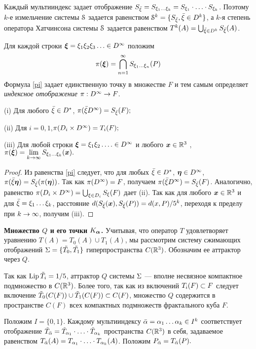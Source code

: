  Каждый мультииндекс задает отображение $S_{\bar{\xi}}=S_{\xi_1\ldots\xi_k}=S_{\xi_1}\cdot\ldots\cdot S_{\xi_k}$. Поэтому $k$-е измельчение системы ${\EuScript S}$ задается равенством
${\EuScript S}^k=\{S_{\bar{\xi}}, {\bar{\xi}}\in  D^k\}$, а $k$-я степень оператора Хатчинсона системы ${\EuScript S}$ задается равенством $T^k(A)=\bigcup_{{\bar{\xi}}\in D^k}S_{\bar{\xi}}(A)$.


Для каждой строки ${\bm{\xi}}=\xi_1\xi_2\xi_3\ldots\in  D^\infty$ положим
\begin{equation}\label{pi}
\pi({\bm{\xi}})=\bigcap\limits_{n=1}^\infty S_{\xi_1\ldots\xi_n}(P)
\end{equation}
Формула \eqref{pi} задает единственную точку в множестве $F$ и тем самым определяет {\em индексное отображение} $\pi:D^\infty\to F$.
\begin{lemma} \label{piD}
{\rm (i)} Для любого ${\bar{\xi}}\in D^*$, $\pi({\bar{\xi}} D^\infty)=S_{\bar{\xi}}(F);$

{\rm (ii)} Для $i=0,1$,\quad $\pi(D_i\times D^\infty)=T_i(F);$

{\rm (iii)} Для любой строки ${\bm{\xi}}=\xi_1\xi_2\ldots.\in D^\infty$ и  любого ${\bm{x}}\in\mathbb{R}^3$ , $\pi({\bm{\xi}})=\lim\limits_{k\to\infty}S_{\xi_1\ldots\xi_k}({\bm{x}}).$ \end{lemma}

\begin{proof}
Из равенства \eqref{pi} следует, что для любых ${\bar{\xi}}\in D^*$, ${\bm{\eta}}\in D^\infty$, $\pi({\bar{\xi}} {\bm{\eta}})=S_{\bar{\xi}}(\pi({\bm{\eta}}))$. Так как $\pi(D^\infty)=F$, получаем $\pi({\bar{\xi}} D^\infty)=S_{\bar{\xi}}(F)$.  Аналогично, равенство $\pi(D_i\times D^\infty)=\bigcup_{\xi\in D_i}S_{\xi}(F)$ дает (ii). Так как для любого ${\bm{x}}\in\mathbb{R}^3$   и для  ${\bar{\xi}}=\xi_1\ldots\xi_k$, расстояние $d(S_{\bar{\xi}}({\bm{x}}),S_{\bar{\xi}}(P))=d(x,P)/5^k $, переходя к пределу при $k\to\infty$, получим (iii).
\end{proof}
  

{\bf Множество $Q$ и его точки $K_{\bm{\alpha}}$.}
Учитывая, что оператор $T$ удовлетворяет уравнению $T(A)=T_0(A)\cup T_1(A)$, мы
рассмотрим систему сжимающих отображений $\Sigma=\{ \tilde{T_0},\tilde{T_1}\}$ гиперпространства $C(\mathbb{R}^3)$. Обозначим ее аттрактор через $Q$.

Так как $\mathop{\rm Lip} \nolimits{\tilde T_i}=1/5$, аттрактор $Q$ системы $\Sigma$ --- вполне несвязное компактное подмножество в $C(\mathbb{R}^3)$. Более того, так как из включений $T_i(F)\subset F$ следует включение ${\tilde T}_0(C(F))\cup {\tilde T}_1(C(F))\subset C(F)$,   множество $Q$ содержится в пространстве  $C(F)$ всех компактных подмножеств фрактального куба $F$.

Положим $I=\{0,1\}$. Каждому мультииндексу ${\bar{\alpha}}=\alpha_1\ldots\alpha_k\in I^k$  соответствует
отображение $\tilde T_{\bar{\alpha}}={\tilde T}_{\alpha_1}\cdot\ldots\cdot{\tilde T}_{\alpha_k}$ пространства $C(\mathbb{R}^3)$ в себя, задаваемое равенством $ T_{\bar{\alpha}}(A)=T_{\alpha_1}\cdot\ldots\cdot T_{\alpha_k}(A)$. Положим $P_{\bar{\alpha}}=T_{\bar{\alpha}}(P).$

